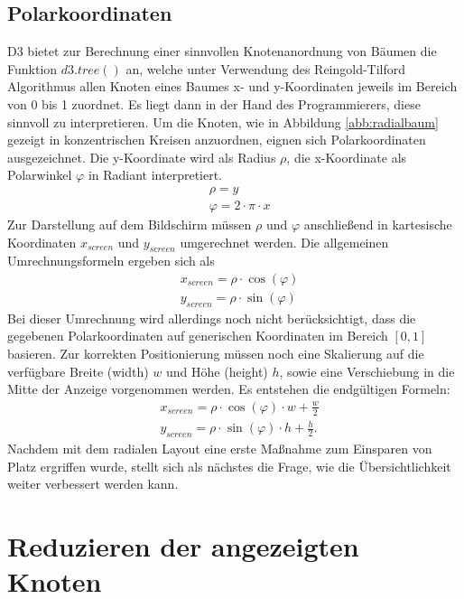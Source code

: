 \subsection{Polarkoordinaten}
D3 bietet zur Berechnung einer sinnvollen Knotenanordnung von Bäumen die Funktion $d3.tree()$ an, welche unter Verwendung des Reingold-Tilford Algorithmus  allen Knoten eines Baumes x- und y-Koordinaten jeweils im Bereich von 0 bis 1 zuordnet. Es liegt dann in der Hand des Programmierers, diese sinnvoll zu interpretieren. Um die Knoten, wie in Abbildung \ref{abb:radialbaum} gezeigt in konzentrischen Kreisen anzuordnen, eignen sich Polarkoordinaten ausgezeichnet. Die y-Koordinate wird als Radius $\rho$, die x-Koordinate als Polarwinkel $\varphi$ in Radiant interpretiert. 
\begin{align*}
&\rho = y\\
&\varphi = 2 \cdot \pi \cdot x
\end{align*}
Zur Darstellung auf dem Bildschirm müssen $\rho$ und $\varphi$ anschließend in kartesische Koordinaten $x_{screen}$ und $y_{screen}$ umgerechnet werden. Die allgemeinen Umrechnungsformeln ergeben sich als
\begin{align*}
&x_{screen} = \rho \cdot \cos (\varphi)\\
&y_{screen} = \rho \cdot \sin (\varphi)
\end{align*}
Bei dieser Umrechnung wird allerdings noch nicht berücksichtigt, dass die gegebenen Polarkoordinaten auf generischen Koordinaten im Bereich $[0,1]$ basieren. Zur korrekten Positionierung müssen noch eine Skalierung auf die verfügbare Breite (width) $w$ und Höhe (height) $h$, sowie eine Verschiebung in die Mitte der Anzeige vorgenommen werden. Es entstehen die endgültigen Formeln:
\begin{align}
&x_{screen} = \rho \cdot \cos (\varphi) \cdot w + \frac{w}{2} \label{eq:polkarthx}\\
&y_{screen} = \rho \cdot \sin (\varphi) \cdot h + \frac{h}{2}.\label{eq:polkarthy}
\end{align}
Nachdem mit dem radialen Layout eine erste Maßnahme zum Einsparen von Platz ergriffen wurde, stellt sich als nächstes die Frage, wie die Übersichtlichkeit weiter verbessert werden kann.


\section{Reduzieren der angezeigten Knoten}


